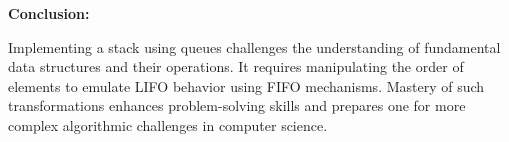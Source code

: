 \textbf{Conclusion:}

Implementing a stack using queues challenges the understanding of fundamental data structures and their operations. It requires manipulating the order of elements to emulate LIFO behavior using FIFO mechanisms. Mastery of such transformations enhances problem-solving skills and prepares one for more complex algorithmic challenges in computer science.